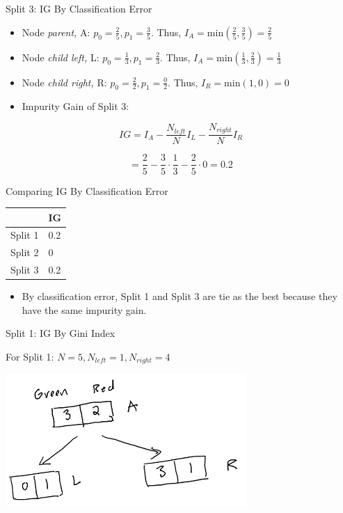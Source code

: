 \documentclass[
  ignorenonframetext,
]{beamer}
\providecommand{\tightlist}{%
  \setlength{\itemsep}{0pt}\setlength{\parskip}{0pt}}
\begin{document}
\begin{frame}{Split 3: IG By Classification Error}
\protect\hypertarget{split-3-ig-by-classification-error-1}{}

\begin{itemize}
\item
  Node \emph{parent,} A: \(p_0 = \frac{2}{5}, p_1 = \frac{3}{5}\). Thus,
  \(I_{A} = \text{min}(\frac{2}{5}, \frac{3}{5}) = \frac{2}{5}\)
\item
  Node \emph{child left,} L: \(p_0 = \frac{1}{3}, p_1 = \frac{2}{3}\).
  Thus, \(I_{A} = \text{min}(\frac{1}{3}, \frac{2}{3}) = \frac{1}{3}\)
\item
  Node \emph{child right,} R: \(p_0 = \frac{2}{2}, p_1 = \frac{0}{2}\).
  Thus, \(I_{R} = \text{min}(1,0) = 0\)
\item
  Impurity Gain of Split 3:
\end{itemize}

\[
IG = I_{A} - \frac{N_{left}}{N}I_{L}-\frac{N_{right}}{N}I_{R}
\]

\[ = \frac{2}{5} - \frac{3}{5} \cdot \frac{1}{3}-\frac{2}{5} \cdot 0 = 0.2\]

\end{frame}

\begin{frame}{Comparing IG By Classification Error}
\protect\hypertarget{comparing-ig-by-classification-error}{}

\begin{longtable}[]{@{}ll@{}}
\toprule
& IG\tabularnewline
\midrule
\endhead
Split 1 & 0.2\tabularnewline
Split 2 & 0\tabularnewline
Split 3 & 0.2\tabularnewline
\bottomrule
\end{longtable}

\begin{itemize}
\tightlist
\item
  By classification error, Split 1 and Split 3 are tie as the best
  because they have the same impurity gain.
\end{itemize}

\end{frame}

\begin{frame}{Split 1: IG By Gini Index}
\protect\hypertarget{split-1-ig-by-gini-index}{}

For Split 1: \(N = 5, N_{left} =1, N_{right} = 4\)

\includegraphics{images2/im1.png}

\end{frame}
\end{document}
